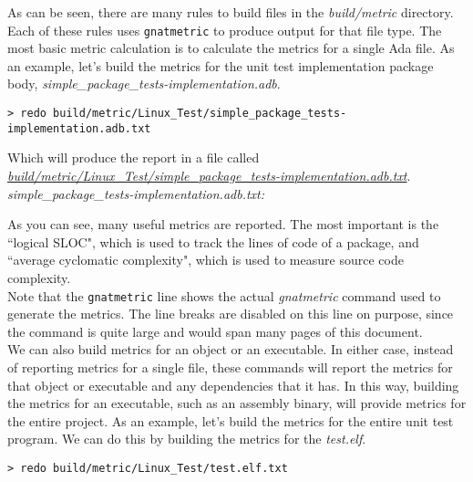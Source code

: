 As can be seen, there are many rules to build files in the \textit{build/metric} directory. Each of these rules uses \texttt{gnatmetric} to produce output for that file type. The most basic metric calculation is to calculate the metrics for a single Ada file. As an example, let's build the metrics for the unit test implementation package body, \textit{simple\_package\_tests-implementation.adb}.

\vspace{5mm} %
\begin{verbatim}
> redo build/metric/Linux_Test/simple_package_tests-implementation.adb.txt
\end{verbatim}
\vspace{5mm} %

Which will produce the report in a file called \textit{\url{build/metric/Linux\_Test/simple\_package\_tests-implementation.adb.txt}}. \\

\textit{simple\_package\_tests-implementation.adb.txt:}

As you can see, many useful metrics are reported. The most important is the ``logical SLOC", which is used to track the lines of code of a package, and ``average cyclomatic complexity", which is used to measure source code complexity. \\

Note that the \texttt{gnatmetric} line shows the actual \textit{gnatmetric} command used to generate the metrics. The line breaks are disabled on this line on purpose, since the command is quite large and would span many pages of this document. \\

We can also build metrics for an object or an executable. In either case, instead of reporting metrics for a single file, these commands will report the metrics for that object or executable and any dependencies that it has. In this way, building the metrics for an executable, such as an assembly binary, will provide metrics for the entire project. As an example, let's build the metrics for the entire unit test program. We can do this by building the metrics for the \textit{test.elf}.

\vspace{5mm} %
\begin{verbatim}
> redo build/metric/Linux_Test/test.elf.txt
\end{verbatim}
\vspace{5mm} %

